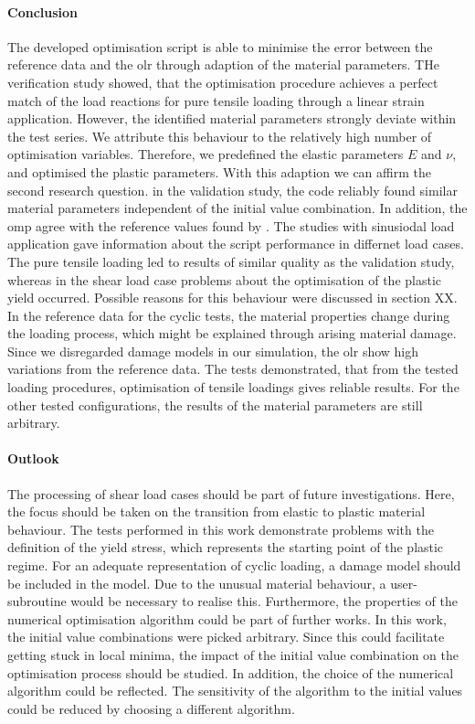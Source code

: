 \paragraph{Conclusion}
The developed optimisation script is able to minimise the error between the reference data and the \acrlong{olr} through adaption of the material parameters. THe verification study showed, that the optimisation procedure achieves a perfect match of the load reactions for pure tensile loading through a linear strain application. However, the identified material parameters strongly deviate within the test series. We attribute this behaviour to the relatively high number of optimisation variables. Therefore, we predefined the elastic parameters $E$ and $\nu$, and optimised the plastic parameters. With this adaption we can affirm the second research question. in the validation study, the code reliably found similar material parameters independent of the initial value combination. In addition, the \acrlong{omp} agree with the reference values found by \citet{ries_deciphering_nodate}. The studies with sinusiodal load application gave information about the script performance in differnet load cases. The pure tensile loading led to results of similar quality as the validation study, whereas in the shear load case problems about the optimisation of the plastic yield occurred. Possible reasons for this behaviour were discussed in section XX. In the reference data for the cyclic tests, the material properties change during the loading process, which might be explained through arising material damage. Since we disregarded damage models in our  simulation, the \acrlong{olr} show high variations from the reference data. The tests demonstrated, that from the tested loading procedures, optimisation of tensile loadings gives reliable results. For the other tested configurations, the results of the material parameters are still arbitrary.


\paragraph{Outlook}
The processing of shear load cases should be part of future investigations. Here, the focus should be taken on the transition from elastic to plastic material behaviour. The tests performed in this work demonstrate problems with the definition of the yield stress, which represents the starting point of the plastic regime. 
For an adequate representation of cyclic loading, a damage model should be included in the  model. Due to the unusual material behaviour, a user-subroutine would be necessary to realise this. 
Furthermore, the properties of the numerical optimisation algorithm could be part of further works. In this work, the initial value combinations were picked arbitrary. Since this could facilitate getting stuck in local minima, the impact of the initial value combination on the optimisation process should be studied. In addition, the choice of the numerical algorithm could be reflected. The sensitivity of the algorithm to the initial values could be reduced by choosing a different algorithm. 

